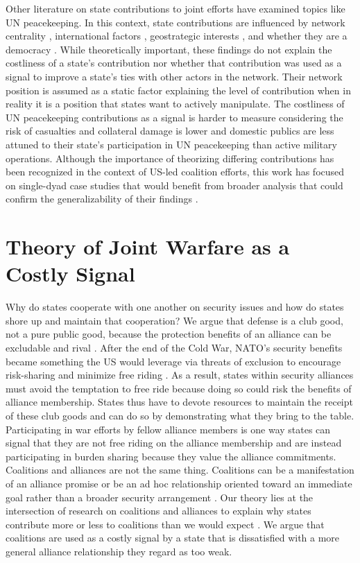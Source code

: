 \documentclass[12pt,letterpaper]{article}
\begin{document}
	Other literature on state contributions to joint efforts have examined topics like UN peacekeeping. In this context, state contributions are influenced by network centrality \citep{dorussen_networkedinternationalpolitics_2016}, international factors \citep{mullenbach_decidingkeeppeace_2005}, geostrategic interests \citep{baltrusaitis_friendsindeedcoalition_2008}, and whether they are a democracy \citep{lebovic_unitingpeacedemocracies_2004}. While theoretically important, these findings do not explain the costliness of a state's contribution nor whether that contribution was used as a signal to improve a state's ties with other actors in the network. Their network position is assumed as a static factor explaining the level of contribution when in reality it is a position that states want to actively manipulate. The costliness of UN peacekeeping contributions as a signal is harder to measure considering the risk of casualties and collateral damage is lower and domestic publics are less attuned to their state's participation in UN peacekeeping than active military operations. Although the importance of theorizing differing contributions has been recognized in the context of US-led coalition efforts, this work has focused on single-dyad case studies that would benefit from broader analysis that could confirm the generalizability of their findings \citep{mello_politicsmultinationalmilitary_2018}.

\section{Theory of Joint Warfare as a Costly Signal}
	Why do states cooperate with one another on security issues and how do states shore up and maintain that cooperation? We argue that defense is a club good, not a pure public good, because the protection benefits of an alliance can be excludable and rival \citep{sandler_clubtheorythirty_1997}. After the end of the Cold War, NATO's security benefits became something the US would leverage via threats of exclusion to encourage risk-sharing and minimize free riding \citep{ringsmose_natoburdensharingredux_2010}. As a result, states within security alliances must avoid the temptation to free ride because doing so could risk the benefits of alliance membership. States thus have to devote resources to maintain the receipt of these club goods and can do so by demonstrating what they bring to the table. Participating in war efforts by fellow alliance members is one way states can signal that they are not free riding on the alliance membership and are instead participating in burden sharing because they value the alliance commitments. Coalitions and alliances are not the same thing. Coalitions can be a manifestation of an alliance promise or be an ad hoc relationship oriented toward an immediate goal rather than a broader security arrangement \citep{weitsman_wartimealliancescoalition_2010}. Our theory lies at the intersection of research on coalitions and alliances to explain why states contribute more or less to coalitions than we would expect \citep{saideman_ambivalentcoalitiondoing_2016}. We argue that coalitions are used as a costly signal by a state that is dissatisfied with a more general alliance relationship they regard as too weak.
	
\end{document}
